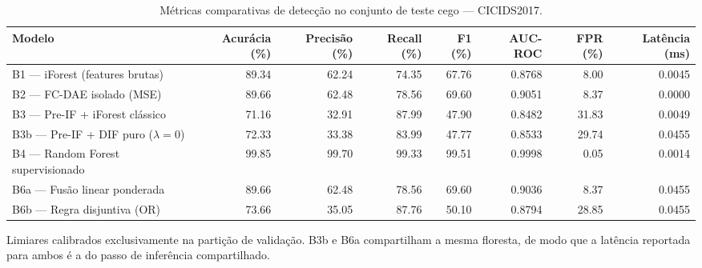 \begin{table}[htbp]
\centering
\caption{Métricas comparativas de detecção no conjunto de teste cego — CICIDS2017.}
\label{tab:tabela4-cicids2017}
\small
\begin{tabular}{lrrrrrrr}
\hline
Modelo & Acurácia (\%) & Precisão (\%) & Recall (\%) & F1 (\%) & AUC-ROC & FPR (\%) & Latência (ms) \\
\hline
B1 — iForest (features brutas) & 89.34 & 62.24 & 74.35 & 67.76 & 0.8768 & 8.00 & 0.0045 \\
B2 — FC-DAE isolado (MSE) & 89.66 & 62.48 & 78.56 & 69.60 & 0.9051 & 8.37 & 0.0000 \\
B3 — Pre-IF + iForest clássico & 71.16 & 32.91 & 87.99 & 47.90 & 0.8482 & 31.83 & 0.0049 \\
B3b — Pre-IF + DIF puro ($\lambda = 0$) & 72.33 & 33.38 & 83.99 & 47.77 & 0.8533 & 29.74 & 0.0455 \\
B4 — Random Forest supervisionado & 99.85 & 99.70 & 99.33 & 99.51 & 0.9998 & 0.05 & 0.0014 \\
B6a — Fusão linear ponderada & 89.66 & 62.48 & 78.56 & 69.60 & 0.9036 & 8.37 & 0.0455 \\
B6b — Regra disjuntiva (OR) & 73.66 & 35.05 & 87.76 & 50.10 & 0.8794 & 28.85 & 0.0455 \\
\hline
\end{tabular}
\begin{flushleft}\footnotesize Limiares calibrados exclusivamente na partição de validação. B3b e B6a compartilham a mesma floresta, de modo que a latência reportada para ambos é a do passo de inferência compartilhado.\end{flushleft}
\end{table}
